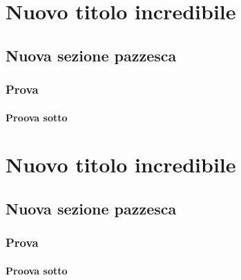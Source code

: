 \documentclass[a4paper, 11pt, openright, twoside]{report}
\begin{document}
\chapter[Nuovo titolo incredibile]{Nuovo titolo incredibile}
\label{chap:Nuovo titolo incredibile}

\lipsum[1]

\section[Nuova sezione pazzesca]{Nuova sezione pazzesca}
\label{chap:Nuova sezione pazzesca}

\subsection[Prova]{Prova}
\label{chap:Prova}

\subsubsection[Proova sotto]{Proova sotto}
\label{chap:Proova sotto}


\chapter[Nuovo titolo incredibile]{Nuovo titolo incredibile}
\label{chap:Nuovo titolo incredibile}

\lipsum[1]

\section[Nuova sezione pazzesca]{Nuova sezione pazzesca}
\label{chap:Nuova sezione pazzesca}

\subsection[Prova]{Prova}
\label{chap:Prova}

\subsubsection[Proova sotto]{Proova sotto}
\label{chap:Proova sotto}
\end{document}
